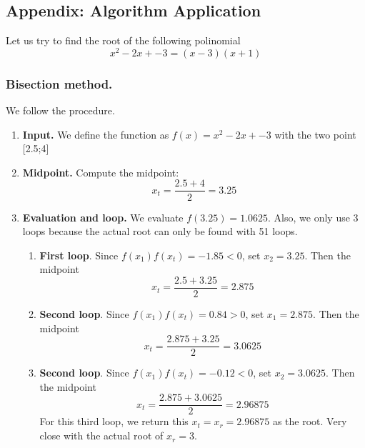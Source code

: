 \documentclass[../../../main.tex]{subfiles}
\begin{document}
\subsection{Appendix: Algorithm Application}
Let us try to find the root of the following polinomial
\begin{equation*}
    x^2- 2 x + -3  =
    \left(x-3\right)\left(x+1\right)
\end{equation*}

\subsubsection{Bisection method.}
We follow the procedure.
\begin{enumerate}
    \item \textbf{Input.} We define the function as $f(x)=x^2- 2 x + -3$ with the two point [2.5;4]
    \item \textbf{Midpoint.} Compute the midpoint:
          \begin{equation*}
              x_t= \frac{2.5+4}{2}=3.25
          \end{equation*}
    \item \textbf{Evaluation and loop.} We evaluate $f(3.25)=1.0625$. Also, we only use 3 loops because the actual root can only be found with 51 loops.
          \begin{enumerate}
              \item \textbf{First loop}. Since $f(x_1)f(x_t)=-1.85<0$, set $x_2=3.25$. Then the midpoint
                    \begin{equation*}
                        x_t=\frac{2.5+3.25}{2}=2.875
                    \end{equation*}
              \item \textbf{Second loop}. Since $f(x_1)f(x_t)=0.84>0$, set $x_1=2.875$. Then the midpoint
                    \begin{equation*}
                        x_t=\frac{2.875+3.25 }{2}=3.0625
                    \end{equation*}
              \item \textbf{Second loop}. Since $f(x_1)f(x_t)=-0.12<0$, set $x_2=3.0625$. Then the midpoint
                    \begin{equation*}
                        x_t=\frac{2.875+3.0625}{2}=2.96875
                    \end{equation*}
                    For this third loop, we return this $x_t=x_r=2.96875$ as the root. Very close with the actual root of $x_r=3$.
          \end{enumerate}
\end{enumerate}
\end{document}
